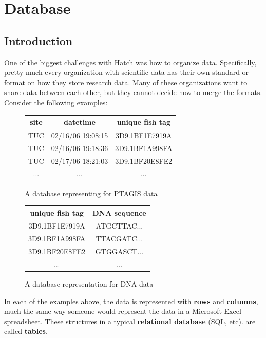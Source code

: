 \section{Database}

\subsection{Introduction}
One of the biggest challenges with Hatch was how to organize data. Specifically, pretty
much every organization with scientific data has their own standard or format on 
how they store research data. Many of these organizations want to share data between 
each other, but they cannot decide how to merge the formats. Consider the following
examples:

\begin{figure}[h]
	\begin{center}
	\begin{tabular}{ | c | c | c | }
		\hline
		site	&	datetime		&	unique fish tag	\\
		\hline
		TUC	&	02/16/06 19:08:15 	&	3D9.1BF1E7919A 	\\
		TUC	&	02/16/06 19:18:36 	&	3D9.1BF1A998FA 	\\
		TUC	&	02/17/06 18:21:03 	&	3D9.1BF20E8FE2	\\
		...	&	...			&	...		\\
		\hline
	\end{tabular}
	\caption{A database representing for PTAGIS data} 
	\label{ptagis_ex1}
	\end{center}
\end{figure}

\begin{figure}[h]
	\begin{center}
	\begin{tabular}{ | c | c | }
		\hline
		unique fish tag	&	DNA sequence	\\
		\hline
		3D9.1BF1E7919A 	&	ATGCTTAC...	\\
		3D9.1BF1A998FA 	&	TTACGATC...	\\
		3D9.1BF20E8FE2	&	GTGGASCT...	\\
		...		&	...		\\
		\hline
	\end{tabular}
	\caption{A database representation for DNA data} 
	\label{dna_ex1}
	\end{center}
\end{figure}

In each of the examples above, the data is represented with \textbf{rows} and 
\textbf{columns}, much the same way someone would represent the data in a Microsoft
Excel spreadsheet. These structures in a typical \textbf{relational database} (SQL, etc).
are called \textbf{tables}.

